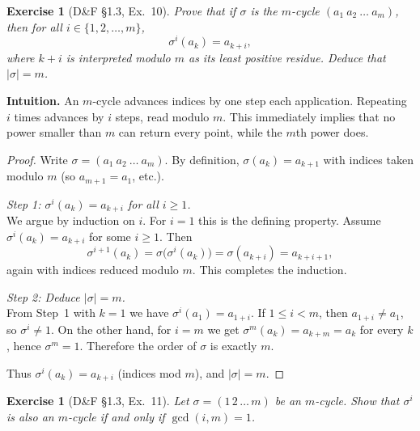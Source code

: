 \documentclass[12pt]{article}
\newtheorem{exercise}[theorem]{Exercise}
\theoremstyle{definition}
\begin{document}
\newpage

\begin{exercise}[D\&F §1.3, Ex.~10]
Prove that if $\sigma$ is the $m$-cycle $(a_{1}\ a_{2}\ \dots\ a_{m})$, then for all $i\in\{1,2,\dots,m\}$,
\[
\sigma^{i}(a_{k})=a_{k+i},
\]
where $k+i$ is interpreted modulo $m$ as its least positive residue. Deduce that $|\sigma|=m$.
\end{exercise}

\dotfill

\noindent
\textbf{Intuition.}
An $m$-cycle advances indices by one step each application. Repeating $i$ times advances by $i$ steps, read modulo $m$.
This immediately implies that no power smaller than $m$ can return every point, while the $m$th power does.

\dotfill

\begin{proof}
Write $\sigma=(a_{1}\ a_{2}\ \dots\ a_{m})$. By definition, $\sigma(a_{k})=a_{k+1}$ with indices taken modulo $m$
(so $a_{m+1}=a_{1}$, etc.).

\dotfill

\noindent\emph{Step 1: $\sigma^{i}(a_{k})=a_{k+i}$ for all $i\ge 1$.}\\
We argue by induction on $i$. For $i=1$ this is the defining property.
Assume $\sigma^{i}(a_{k})=a_{k+i}$ for some $i\ge 1$. Then
\[
\sigma^{i+1}(a_{k})
= \sigma\!\big(\sigma^{i}(a_{k})\big)
= \sigma(a_{k+i})
= a_{k+i+1},
\]
again with indices reduced modulo $m$. This completes the induction.

\dotfill

\noindent\emph{Step 2: Deduce $|\sigma|=m$.}\\
From Step~1 with $k=1$ we have $\sigma^{i}(a_{1})=a_{1+i}$.
If $1\le i<m$, then $a_{1+i}\neq a_{1}$, so $\sigma^{i}\neq 1$.
On the other hand, for $i=m$ we get $\sigma^{m}(a_{k})=a_{k+m}=a_{k}$ for every $k$, hence $\sigma^{m}=1$.
Therefore the order of $\sigma$ is exactly $m$.

\dotfill

Thus $\sigma^{i}(a_{k})=a_{k+i}$ (indices mod $m$), and $|\sigma|=m$.
\end{proof}

\newpage

\begin{exercise}[D\&F §1.3, Ex.~11]
Let $\sigma=(1\,2\,\dots\,m)$ be an $m$-cycle. Show that $\sigma^{i}$ is also an $m$-cycle if and only if $\gcd(i,m)=1$.
\end{exercise}
\end{document}
